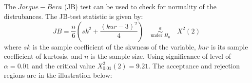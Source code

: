 \subsection{}

The $Jarque-Bera$ (JB) test can be used to check for normality of the distrubances. The JB-test statistic is given by:
$$JB = \dfrac{n}{6} \left( sk^2 + \dfrac{(kur-3)^2}{4} \right) \quad \overset{a}{\underset{\text{under }H_0}{\sim}} \quad X^2(2)$$
where $sk$ is the sample coefficient of the skwness of the variable, $kur$ is its sample coefficient of kurtosis, and $n$ is the sample size. Using significance of level of $\alpha = 0.01$ and the critical value $X^2_{0.01}(2) = 9.21$. The acceptance and rejection regions are in the illustration below:

\begin{center}
\end{center}